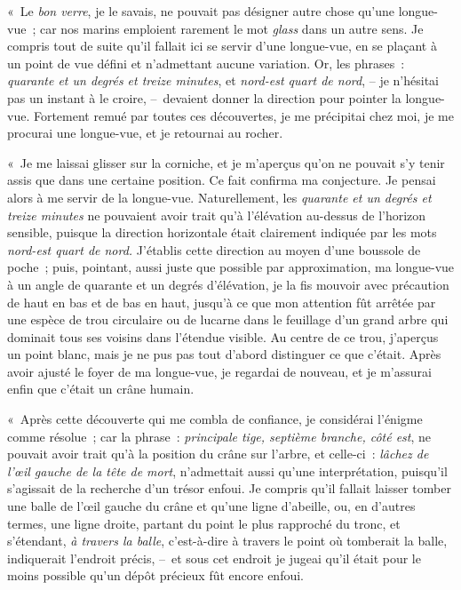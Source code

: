 \documentclass[french,twoside]{book} %
\begin{document}
« Le \emph{bon verre}, je le savais, ne pouvait pas désigner autre chose qu’une longue-vue ; car nos marins emploient rarement le mot\emph{ glass} dans un autre sens. Je compris tout de suite qu’il fallait ici se servir d’une longue-vue, en se plaçant à un point de vue défini et n’admettant aucune variation. Or, les phrases : \emph{quarante et un degrés et treize minutes}, et \emph{nord-est quart de nord}, – je n’hésitai pas un instant à le croire, – devaient donner la direction pour pointer la longue-vue. Fortement remué par toutes ces découvertes, je me précipitai chez moi, je me procurai une longue-vue, et je retournai au rocher.\par
« Je me laissai glisser sur la corniche, et je m’aperçus qu’on ne pouvait s’y tenir assis que dans une certaine position. Ce fait confirma ma conjecture. Je pensai alors à me servir de la longue-vue. Naturellement, les \emph{quarante et un degrés et treize minutes} ne pouvaient avoir trait qu’à l’élévation au-dessus de l’horizon sensible, puisque la direction horizontale était clairement indiquée par les mots \emph{nord-est quart de nord.} J’établis cette direction au moyen d’une boussole de poche ; puis, pointant, aussi juste que possible par approximation, ma longue-vue à un angle de quarante et un degrés d’élévation, je la fis mouvoir avec précaution de haut en bas et de bas en haut, jusqu’à ce que mon attention fût arrêtée par une espèce de trou circulaire ou de lucarne dans le feuillage d’un grand arbre qui dominait tous ses voisins dans l’étendue visible. Au centre de ce trou, j’aperçus un point blanc, mais je ne pus pas tout d’abord distinguer ce que c’était. Après avoir ajusté le foyer de ma longue-vue, je regardai de nouveau, et je m’assurai enfin que c’était un crâne humain.\par
« Après cette découverte qui me combla de confiance, je considérai l’énigme comme résolue ; car la phrase : \emph{principale tige, septième branche, côté est}, ne pouvait avoir trait qu’à la position du crâne sur l’arbre, et celle-ci : \emph{lâchez de l’œil gauche de la tête de mort}, n’admettait aussi qu’une interprétation, puisqu’il s’agissait de la recherche d’un trésor enfoui. Je compris qu’il fallait laisser tomber une balle de l’œil gauche du crâne et qu’une ligne d’abeille, ou, en d’autres termes, une ligne droite, partant du point le plus rapproché du tronc, et s’étendant, \emph{à travers la balle}, c’est-à-dire à travers le point où tomberait la balle, indiquerait l’endroit précis, – et sous cet endroit je jugeai qu’il était pour le moins possible qu’un dépôt précieux fût encore enfoui.\par
\end{document}
